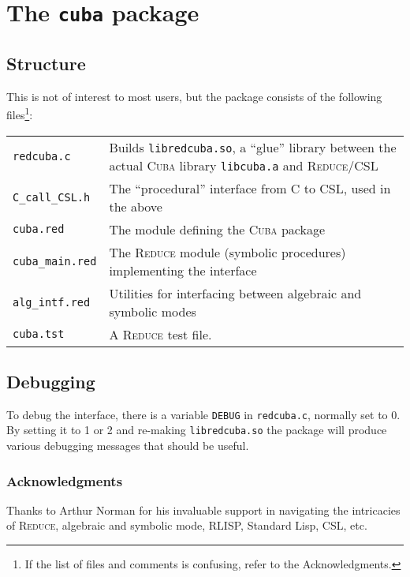 \documentclass[11pt]{article}
\newcommand{\Reduce}{\textsc{Reduce}}
\newcommand{\Cuba}{\textsc{Cuba}}
\begin{document}
\section {The \texttt{cuba} package}

\subsection{Structure}

This is not of interest to most users, but the package consists of the following
files\footnote{If the list of files and comments is confusing, refer to the
  Acknowledgments.}:
\begin{table*}[h]
  \centering
  \begin{tabular}{|l|p{}|} \hline
    \texttt{redcuba.c} & Builds \texttt{libredcuba.so}, a ``glue'' library
    between the actual {\Cuba} library \texttt{libcuba.a} and {\Reduce}/CSL \\
    \texttt{C\_call\_CSL.h} &  The ``procedural'' interface from C to CSL, used
    in the above \\ \hline
    \texttt{cuba.red}       & The module defining the {\Cuba} package \\
    \texttt{cuba\_main.red} &  The {\Reduce} module (symbolic procedures) implementing
    the interface \\ 
    \texttt{alg\_intf.red}  & Utilities for interfacing between algebraic and
     symbolic modes \\
    \texttt{cuba.tst} & A {\Reduce} test file. \\
    \hline
  \end{tabular}
\end{table*}

\subsection{Debugging}

To debug the interface, there is a variable \texttt{DEBUG} in
\texttt{redcuba.c}, normally set to 0.  By setting it to 1 or 2 and re-making
\texttt{libredcuba.so} the package will produce various debugging messages that
should be useful.



\subsubsection*{Acknowledgments}
Thanks to Arthur Norman for his invaluable support in navigating the intricacies
of {\Reduce}, algebraic and symbolic mode, RLISP, Standard Lisp, CSL, etc.
\end{document}
